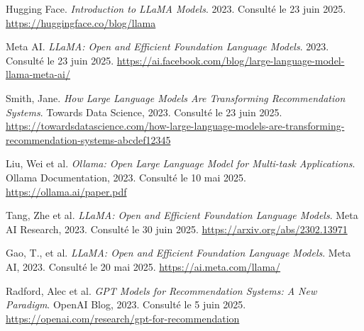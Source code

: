 \begin{thebibliography}{99}
Hugging Face. 
\textit{Introduction to LLaMA Models}. 2023. 
Consulté le 23 juin 2025. \url{https://huggingface.co/blog/llama}

Meta AI. 
\textit{LLaMA: Open and Efficient Foundation Language Models}. 2023. 
Consulté le 23 juin 2025. \url{https://ai.facebook.com/blog/large-language-model-llama-meta-ai/}

Smith, Jane. 
\textit{How Large Language Models Are Transforming Recommendation Systems}. Towards Data Science, 2023. 
Consulté le 23 juin 2025. \url{https://towardsdatascience.com/how-large-language-models-are-transforming-recommendation-systems-abcdef12345}

Liu, Wei et al.  
\textit{Ollama: Open Large Language Model for Multi-task Applications}. Ollama Documentation, 2023. 
Consulté le 10 mai 2025. \url{https://ollama.ai/paper.pdf}

Tang, Zhe et al.  
\textit{LLaMA: Open and Efficient Foundation Language Models}. Meta AI Research, 2023. 
Consulté le 30 juin 2025. \url{https://arxiv.org/abs/2302.13971}

Gao, T., et al.  
\textit{LLaMA: Open and Efficient Foundation Language Models}. Meta AI, 2023. 
Consulté le 20 mai 2025. \url{https://ai.meta.com/llama/}

Radford, Alec et al.  
\textit{GPT Models for Recommendation Systems: A New Paradigm}. OpenAI Blog, 2023. 
Consulté le 5 juin 2025. \url{https://openai.com/research/gpt-for-recommendation}

\end{thebibliography}